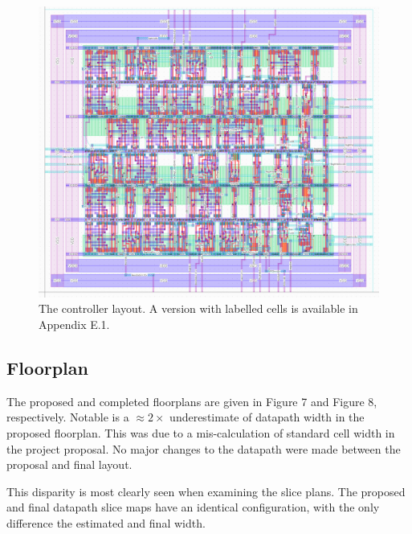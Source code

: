\documentclass[12pt]{article}
\begin{document}
\begin{figure}[H]
    \begin{center}
    \includegraphics[width=12cm]{HMMMControllerFull.png}
    \end{center}
    \caption{The controller layout. A version with labelled cells is available in Appendix E.1.}
    \label{fig:controllerlayout}
\end{figure}

\subsection{Floorplan}

The proposed and completed floorplans are given in Figure 7 and Figure 8, respectively. Notable is a $\approx 2\times$  underestimate of datapath width in the proposed floorplan. This was due to a mis-calculation of standard cell width in the project proposal. No major changes to the datapath were made between the proposal and final layout.

This disparity is most clearly seen when examining the slice plans. The proposed and final datapath slice maps have an identical configuration, with the only difference the estimated and final width.
\end{document}
